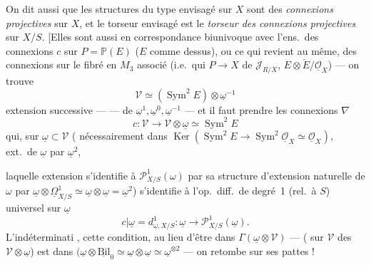 \documentclass[11pt,a4paper]{article}
\begin{document}
On dit aussi que les structures du type envisagé sur $X$ sont des \emph{connexions projectives} sur $X$, et le torseur envisagé est le \emph{torseur des connexions projectives} sur $X/S$. [Elles sont aussi en correspondance biunivoque avec l'ens.\ des connexions  $c$ sur $P = \mathbb{P}(E)$ ($E$ comme dessus), ou ce qui revient au même, des connexions  sur le fibré en $M_3$ \struck{\ill{}}  associé (i.e.\ qui  \struck{\ill{}} $P \to X$ de $\mathcal{J}_{R/X}$,   $E \otimes \check{E}/\underline{\mathcal{O}}_X$) — on trouve
\[
\mathcal{V} \simeq (\operatorname{Sym}^{2} E) \otimes \underline{\omega}^{-1}
\]
extension successive —  \ill{} \ill{} — de $\underline{\omega}^{1}, \underline{\omega}^{0}, \underline{\omega}^{-1}$ — et il faut prendre les connexions $\nabla$
\[
c : \mathcal{V} \longrightarrow \mathcal{V} \otimes \underline{\omega} \simeq \operatorname{Sym}^{2} E
\]
qui, sur $\underline{\omega} \subset \mathcal{V}$ ( nécessairement dans $\operatorname{Ker}(\operatorname{Sym}^{2} E \to \operatorname{Sym}^{2}\underline{\mathcal{O}}_X \simeq \underline{\mathcal{O}}_X)$, ext.\ de $\underline{\omega}$ par $\underline{\omega}^{2}$,

laquelle extension s'identifie à $\mathcal{P}^{1}_{X/S}(\omega)$ par sa structure d'extension naturelle de $\omega$ par $\underline{\omega} \otimes \underline{\Omega}^{1}_{X/S} \simeq \underline{\omega} \otimes \underline{\omega} = \underline{\omega}^{2}$) s'identifie à l'op.\ diff.\ de degré~1 (rel.\ à $S$) universel sur $\underline{\omega}$
\[
c|\underline{\omega} = d^{1}_{\underline{\omega}, X/S} : \underline{\omega} \longrightarrow \mathcal{P}^{1}_{X/S}(\underline{\omega}) .
\]
L'indéterminati ,  cette condition, au lieu d'être dans $\Gamma(\underline{\omega} \otimes \mathcal{V})$ — \struck{\ill{}} ( sur $\mathcal{V}$   des $\mathcal{V} \otimes \underline{\omega}$) est dans $(\underline{\omega} \otimes \underline{\mathrm{Bil}}_0 \simeq \underline{\omega} \otimes \underline{\omega} \simeq \underline{\omega}^{\otimes 2}$ — on retombe sur ses pattes !
\end{document}
